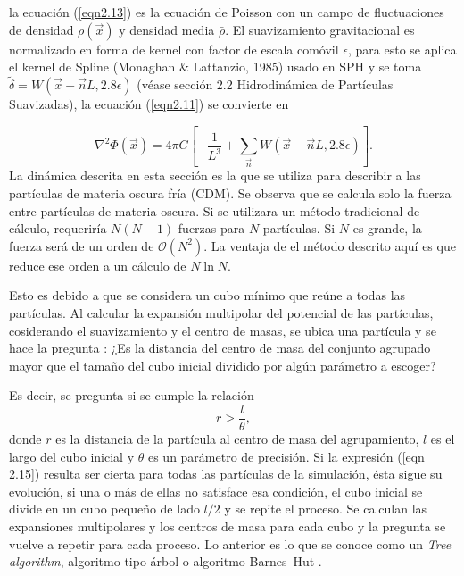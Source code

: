 \documentclass[a4paper,openright,12pt]{book}
\begin{document}
la ecuación (\ref{eqn2.13}) es la ecuación de Poisson con un campo de fluctuaciones de densidad $\rho(\vec{x})$ y densidad media $\bar{\rho}$.
El suavizamiento gravitacional es normalizado en forma de kernel con factor de escala comóvil $\epsilon$, para esto se aplica el kernel de Spline (Monaghan \& Lattanzio, 1985) \cite{b8.1} usado en SPH y se toma $\tilde{\delta} = W(\vec{x}-\vec{n}L,2.8\epsilon)$ (véase sección 2.2 Hidrodinámica de Partículas Suavizadas), la ecuación (\ref{eqn2.11}) se convierte en

\begin{equation}
 \nabla^{2}\Phi(\vec{x})
 =
 4\pi G
 \left[
 -\frac{1}{L^{3}}
 +
 \sum_{\vec{n}}W(\vec{x}-\vec{n}L,2.8\epsilon)
 \right].
\end{equation}\label{eqn2.14}
La dinámica descrita en esta sección es la que se utiliza para describir a las partículas de materia oscura fría (CDM). Se observa que se calcula solo la fuerza entre partículas de materia oscura. Si se utilizara un método tradicional de cálculo,  requeriría $N(N-1)$ fuerzas para $N$ partículas. Si $N$ es grande, la fuerza será de un orden de $\mathcal{O}(N^{2})$. La ventaja de el método descrito aquí es que reduce ese orden a un cálculo de $N \ln N$. 

Esto es debido a que se considera un cubo mínimo que reúne a todas las partículas. Al calcular la expansión multipolar del potencial de las partículas, cosiderando el suavizamiento y el centro de masas, se ubica una partícula y se hace la pregunta : ¿Es la distancia del centro de masa del conjunto agrupado mayor que el tamaño del cubo inicial dividido por algún parámetro a escoger?

Es decir, se pregunta si se cumple la relación 
\begin{equation}
r > \frac{l}{\theta}, \label{eqn 2.15}
\end{equation}
donde $r$ es la distancia de la partícula al centro de masa del agrupamiento, $l$ es el largo del cubo inicial y $\theta$ es un parámetro de precisión. Si la expresión (\ref{eqn 2.15}) resulta ser cierta para todas las partículas de la simulación, ésta sigue su evolución, si una o más de ellas no satisface esa condición, el cubo inicial se divide en un cubo pequeño de lado $l/2$ y se repite el proceso. Se calculan las expansiones multipolares y los centros de masa para cada cubo y la pregunta se vuelve a repetir para cada proceso. Lo anterior es lo que se conoce como un \textit{Tree algorithm}, algoritmo tipo árbol o algoritmo Barnes--Hut \cite{b8.2}.
 
\end{document}
